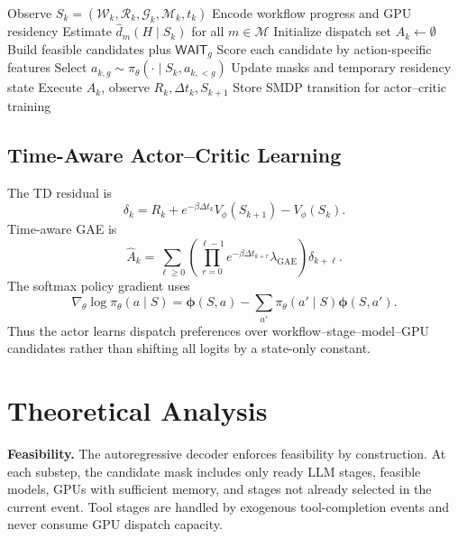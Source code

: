 \documentclass[10pt,conference]{IEEEtran}
\newcommand{\WPRO}{\textsc{WPRO}}
\newcommand{\calW}{\mathcal{W}}
\newcommand{\calR}{\mathcal{R}}
\newcommand{\calG}{\mathcal{G}}
\newcommand{\calM}{\mathcal{M}}
\newcommand{\calI}{\mathcal{I}}
\newcommand{\phia}{\boldsymbol{\phi}}
\begin{document}
\begin{algorithm}[t]
\caption{\WPRO\ at an orchestration event}
\label{alg:wpro}
\begin{algorithmic}[1]
\State Observe \(S_k=(\calW_k,\calR_k,\calG_k,\calM_k,t_k)\)
\State Encode workflow progress and GPU residency
\State Estimate \(\hat d_m(H\mid S_k)\) for all \(m\in\calM\)
\State Initialize dispatch set \(A_k\gets\emptyset\)
\For{idle GPU \(g\in\calI_k\)}
    \State Build feasible candidates plus \(\textsf{WAIT}_g\)
    \State Score each candidate by action-specific features
    \State Select \(a_{k,g}\sim\pi_{\theta}(\cdot\mid S_k,a_{k,<g})\)
    \State Update masks and temporary residency state
\EndFor
\State Execute \(A_k\), observe \(R_k,\Delta t_k,S_{k+1}\)
\State Store SMDP transition for actor--critic training
\end{algorithmic}
\end{algorithm}

\subsection{Time-Aware Actor--Critic Learning}

The TD residual is
\begin{equation}
\delta_k=R_k+e^{-\beta\Delta t_k}V_{\phi}(S_{k+1})-V_{\phi}(S_k).
\end{equation}
Time-aware GAE is
\begin{equation}
\hat A_k=\sum_{\ell\ge0}
\left(\prod_{r=0}^{\ell-1}e^{-\beta\Delta t_{k+r}}\lambda_{\mathrm{GAE}}\right)
\delta_{k+\ell}.
\end{equation}
The softmax policy gradient uses
\begin{equation}
\nabla_\theta\log\pi_\theta(a\mid S)=
\phia(S,a)-\sum_{a'}\pi_\theta(a'\mid S)\phia(S,a').
\end{equation}
Thus the actor learns dispatch preferences over workflow--stage--model--GPU candidates rather than shifting all logits by a state-only constant.

\section{Theoretical Analysis}

\textbf{Feasibility.}
The autoregressive decoder enforces feasibility by construction. At each substep, the candidate mask includes only ready LLM stages, feasible models, GPUs with sufficient memory, and stages not already selected in the current event. Tool stages are handled by exogenous tool-completion events and never consume GPU dispatch capacity.
\end{document}
